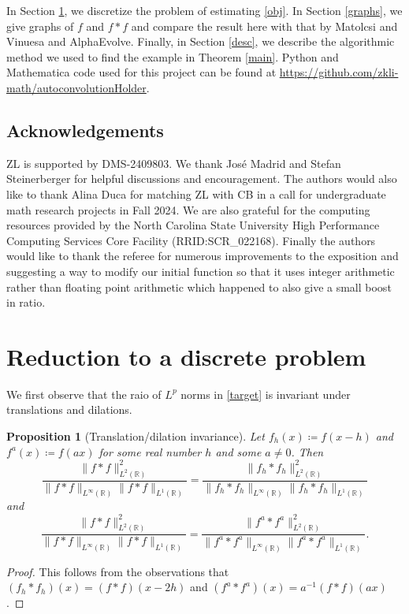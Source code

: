 \documentclass[reqno, 11pt]{amsart}
\newcommand{\R}[0]{\mathbb{R}}
\newcommand{\nms}[1]{\| #1 \|}
\newtheorem{prop}[thm]{Proposition}
\theoremstyle{remark}
\begin{document}
In Section \ref{setup}, we discretize the problem of estimating \eqref{obj}. In Section
\ref{graphs}, we give graphs of $f$ and $f \ast f$ and compare the result here with that
by Matolcsi and Vinuesa and AlphaEvolve. Finally, in Section \ref{desc}, we describe the algorithmic
method we used to find the example in Theorem \ref{main}.
Python and Mathematica code used for this project
can be found at \url{https://github.com/zkli-math/autoconvolutionHolder}.

\subsection*{Acknowledgements}
ZL is supported by DMS-2409803. We thank Jos\'e Madrid and Stefan Steinerberger
for helpful discussions and encouragement.
The authors would also like to thank Alina Duca for matching ZL
with CB in a call for undergraduate math research projects in Fall 2024.
We are also grateful for the computing resources provided by the North Carolina State University High Performance Computing Services Core Facility (RRID:SCR\_022168). Finally the authors would like to thank the referee
for numerous improvements to the exposition and suggesting a way
to modify our initial function so that it uses integer arithmetic
rather than floating point arithmetic which happened to also give a small boost in ratio.

\section{Reduction to a discrete problem}\label{setup}
We first observe that the raio of $L^p$ norms in \eqref{target} is invariant under translations and dilations.

\begin{prop}[Translation/dilation invariance]\label{tdi}
Let $f_{h}(x) \coloneqq f(x - h)$ and $f^{a}(x) \coloneqq f(ax)$ for some real number $h$ and some $a \neq 0$. Then
$$\frac{\nms{f \ast f}_{L^{2}(\R)}^{2}}{\nms{f \ast f}_{L^{\infty}(\R)}\nms{f \ast f}_{L^{1}(\R)}} = \frac{\nms{f_h \ast f_h}_{L^{2}(\R)}^{2}}{\nms{f_h \ast f_h}_{L^{\infty}(\R)}\nms{f_h \ast f_h}_{L^{1}(\R)}}$$
and
$$\frac{\nms{f \ast f}_{L^{2}(\R)}^{2}}{\nms{f \ast f}_{L^{\infty}(\R)}\nms{f \ast f}_{L^{1}(\R)}} = \frac{\nms{f^{a} \ast f^{a}}_{L^{2}(\R)}^{2}}{\nms{f^{a} \ast f^{a}}_{L^{\infty}(\R)}\nms{f^{a} \ast f^{a}}_{L^{1}(\R)}}.$$
\end{prop}
\begin{proof}
This follows from the observations that
$(f_{h} \ast f_{h})(x) = (f \ast f)(x - 2h)$ and $(f^{a} \ast f^{a})(x) = a^{-1}(f \ast f)(ax)$.
\end{proof}
\end{document}
